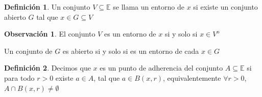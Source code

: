\documentclass[12pt]{article}
\newcommand{\E}{\mathbb{E}}
\newcommand{\open}{\mathrm{o}}
\theoremstyle{definition}
\newtheorem{definition}{Definición}[section]
\newtheorem*{remark}{Observación}
\begin{document}
\begin{definition}
 Un conjunto $V \subseteq \E$ se llama un entorno de $x$ si existe un conjunto abierto $G$ tal que $x \in G \subseteq V$ 
\end{definition}

\begin{remark}
  El conjunto $V$ es un entorno de $x$ si y solo si $x \in V^{\open}$

  Un conjunto de $G$ es abierto si y solo si es un entorno de cada $x \in G$
\end{remark}

\begin{definition}
  Decimos que $x$ es un punto de adherencia del conjunto $A \subseteq \E$ si para todo $r > 0$ existe $a \in A$, tal que $a \in B(x,r)$, equivalentemente $\forall r > 0$, $A \cap B(x,r) \neq \emptyset$
\end{definition}
\end{document}
